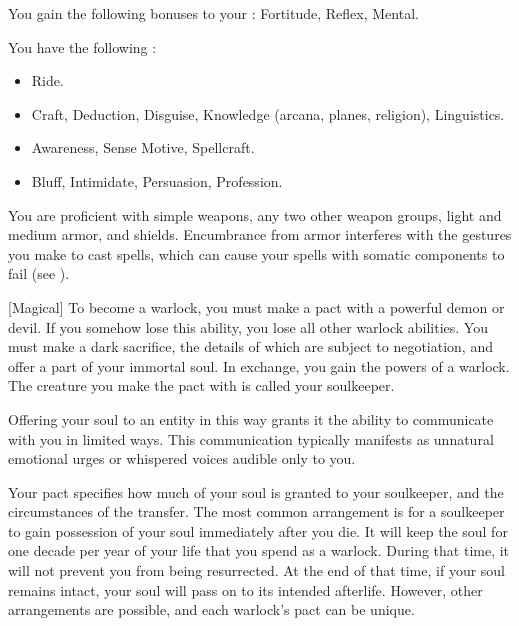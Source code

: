         You gain the following bonuses to your :  Fortitude,  Reflex,  Mental.

        You have the following :
        \begin{itemize}
            \item {} Ride.
            \item {} Craft, Deduction, Disguise, Knowledge (arcana, planes, religion), Linguistics.
            \item {} Awareness, Sense Motive, Spellcraft.
            \item {} Bluff, Intimidate, Persuasion, Profession.
        \end{itemize}

        You are proficient with simple weapons, any two other weapon groups, light and medium armor, and shields.
        Encumbrance from armor interferes with the gestures you make to cast spells, which can cause your spells with somatic components to fail (see ).

        [Magical]
        To become a warlock, you must make a pact with a powerful demon or devil.
        If you somehow lose this ability, you lose all other warlock abilities.
        You must make a dark sacrifice, the details of which are subject to negotiation, and offer a part of your immortal soul.
        In exchange, you gain the powers of a warlock.
        The creature you make the pact with is called your soulkeeper.

        Offering your soul to an entity in this way grants it the ability to communicate with you in limited ways.
        This communication typically manifests as unnatural emotional urges or whispered voices audible only to you.

        Your pact specifies how much of your soul is granted to your soulkeeper, and the circumstances of the transfer.
        The most common arrangement is for a soulkeeper to gain possession of your soul immediately after you die.
        It will keep the soul for one decade per year of your life that you spend as a warlock.
        During that time, it will not prevent you from being resurrected.
        At the end of that time, if your soul remains intact, your soul will pass on to its intended afterlife.
        However, other arrangements are possible, and each warlock's pact can be unique.

